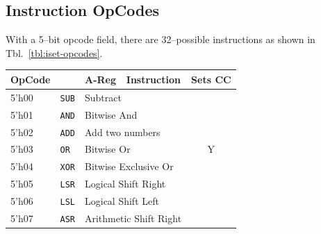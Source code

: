 \documentclass{gqtekspec}
\begin{document}
\subsection{Instruction OpCodes}\label{sec:isa-opcodes}
With a 5--bit opcode field, there are 32--possible instructions as shown in 
Tbl.~\ref{tbl:iset-opcodes}.
\begin{table}\begin{center}
\begin{tabular}{|l|l|l|l|c|} \hline \rowcolor[gray]{0.85}
OpCode & & A-Reg & Instruction &Sets CC \\\hline\hline
5'h00 & {\tt SUB} & \multicolumn{2}{l|}{Subtract} &   \\\cline{1-4}
5'h01 & {\tt AND} & \multicolumn{2}{l|}{Bitwise And} &   \\\cline{1-4}
5'h02 & {\tt ADD} & \multicolumn{2}{l|}{Add two numbers} &   \\\cline{1-4}
5'h03 & {\tt OR}  & \multicolumn{2}{l|}{Bitwise Or} & Y \\\cline{1-4}
5'h04 & {\tt XOR} & \multicolumn{2}{l|}{Bitwise Exclusive Or} &   \\\cline{1-4}
5'h05 & {\tt LSR} & \multicolumn{2}{l|}{Logical Shift Right} &   \\\cline{1-4}
5'h06 & {\tt LSL} & \multicolumn{2}{l|}{Logical Shift Left} &   \\\cline{1-4}
5'h07 & {\tt ASR} & \multicolumn{2}{l|}{Arithmetic Shift Right} &   \\\hline


\end{tabular}
\end{center}
\end{table}
\end{document}
